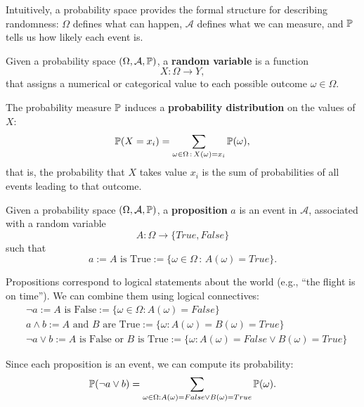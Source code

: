 \documentclass[10pt, letterpaper]{report}
\begin{document}
\bigskip
Intuitively, a probability space provides the formal structure for describing randomness:
$\Omega$ defines what can happen, $\mathcal A$ defines what we can measure, and ${\mathbb P}$ tells us how likely each event is.

\begin{definition}
	Given a probability space $(\Omega, \mathcal A, {\mathbb P})$, a \textbf{random variable} is a function
	\[
		X : \Omega \rightarrow Y,
	\]
	that assigns a numerical or categorical value to each possible outcome $\omega \in \Omega$.
\end{definition}

\noindent
The probability measure ${\mathbb P}$ induces a \textbf{probability distribution} on the values of $X$:
\begin{equation}
	{\mathbb P}(X = x_i) = \sum_{\omega \in \Omega \, : \, X(\omega) = x_i} {\mathbb P}(\omega),
\end{equation}
that is, the probability that $X$ takes value $x_i$ is the sum of probabilities of all events leading to that outcome.

\bigskip
\begin{definition}
	Given a probability space $(\Omega, \mathcal A, {\mathbb P})$, a \textbf{proposition} $a$ is an event in $\mathcal A$, associated with a random variable
	\[
		A : \Omega \rightarrow \{True, False\}
	\]
	such that
	\[
		a := A \text{ is True} := \{\omega \in \Omega \, : \, A(\omega) = True\}.
	\]
\end{definition}

\noindent
Propositions correspond to logical statements about the world (e.g., “the flight is on time”).
We can combine them using logical connectives:
\begin{align}
	 & \lnot a := A \text{ is False} := \{\omega \in \Omega : A(\omega) = False\}                                     \\
	 & a \land b := A \text{ and } B \text{ are True} := \{\omega : A(\omega)=B(\omega)=True\}                        \\
	 & \lnot a \lor b := A \text{ is False or } B \text{ is True} := \{\omega : A(\omega)=False \lor B(\omega)=True\}
\end{align}

Since each proposition is an event, we can compute its probability:
\begin{equation}
	{\mathbb P}(\lnot a \lor b) = \sum_{\omega \in \Omega : A(\omega)=False \lor B(\omega)=True} {\mathbb P}(\omega).
\end{equation}
\end{document}
